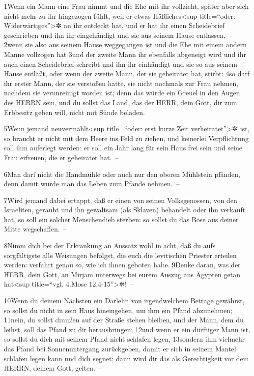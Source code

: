 1Wenn ein Mann eine Frau nimmt und die Ehe mit ihr vollzieht, später
aber sich nicht mehr zu ihr hingezogen fühlt, weil er etwas
Häßliches\textless sup title=``oder: Widerwärtiges''\textgreater✲ an ihr
entdeckt hat, und er hat ihr einen Scheidebrief geschrieben und ihn ihr
eingehändigt und sie aus seinem Hause entlassen,~-- 2wenn sie also aus
seinem Hause weggegangen ist und die Ehe mit einem andern Manne
vollzogen hat 3und der zweite Mann ihr ebenfalls abgeneigt wird und ihr
auch einen Scheidebrief schreibt und ihn ihr einhändigt und sie so aus
seinem Hause entläßt, oder wenn der zweite Mann, der sie geheiratet hat,
stirbt: 4so darf ihr erster Mann, der sie verstoßen hatte, sie nicht
nochmals zur Frau nehmen, nachdem sie verunreinigt worden ist; denn das
würde ein Greuel in den Augen des HERRN sein, und du sollst das Land,
das der HERR, dein Gott, dir zum Erbbesitz geben will, nicht mit Sünde
beladen.

5Wenn jemand neuvermählt\textless sup title=``oder: erst kurze Zeit
verheiratet''\textgreater✲ ist, so braucht er nicht mit dem Heere ins
Feld zu ziehen, und keinerlei Verpflichtung soll ihm auferlegt werden:
er soll ein Jahr lang für sein Haus frei sein und seine Frau erfreuen,
die er geheiratet hat.~--

6Man darf nicht die Handmühle oder auch nur den oberen Mühlstein
pfänden, denn damit würde man das Leben zum Pfande nehmen.~--

7Wird jemand dabei ertappt, daß er einen von seinen Volksgenossen, von
den Israeliten, geraubt und ihn gewaltsam (als Sklaven) behandelt oder
ihn verkauft hat, so soll ein solcher Menschendieb sterben: so sollst du
das Böse aus deiner Mitte wegschaffen.~--

8Nimm dich bei der Erkrankung an Aussatz wohl in acht, daß du aufs
sorgfältigste alle Weisungen befolgst, die euch die levitischen Priester
erteilen werden: verfahrt genau so, wie ich ihnen geboten habe. 9Denke
daran, was der HERR, dein Gott, an Mirjam unterwegs bei eurem Auszug aus
Ägypten getan hat\textless sup title=``vgl. 4.Mose
12,4-15''\textgreater✲!~--

10Wenn du deinem Nächsten ein Darlehn von irgendwelchem Betrage
gewährst, so sollst du nicht in sein Haus hineingehen, um ihm ein Pfand
abzunehmen; 11nein, du sollst draußen auf der Straße stehen bleiben, und
der Mann, dem du leihst, soll das Pfand zu dir herausbringen; 12und wenn
er ein dürftiger Mann ist, so sollst du dich mit seinem Pfand nicht
schlafen legen, 13sondern ihm vielmehr das Pfand bei Sonnenuntergang
zurückgeben, damit er sich in seinem Mantel schlafen legen kann und dich
segnet; dann wird dir das als Gerechtigkeit vor dem HERRN, deinem Gott,
gelten.~--

